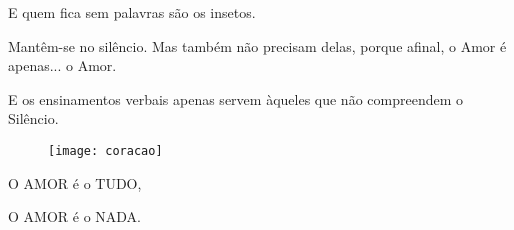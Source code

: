 E quem fica sem palavras são os insetos.

Mantêm-se no silêncio. Mas também não precisam delas, porque afinal, o Amor é apenas... o Amor.

E os ensinamentos verbais apenas servem àqueles que não compreendem o Silêncio.

\begin{figure}[h]
    \centering
    \texttt{[image: coracao]}
\end{figure}

\bigbreak
O AMOR é o TUDO,

O AMOR é o NADA.
